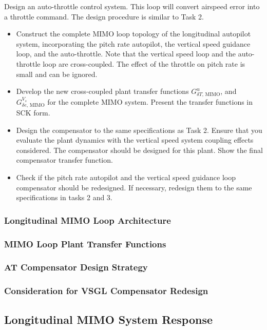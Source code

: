 Design an auto-throttle control system. This loop will convert airspeed error into a throttle command. The design procedure is similar to Task 2.
\begin{itemize}
\item Construct the complete MIMO loop topology of the longitudinal autopilot system, incorporating the pitch rate autopilot, the vertical speed guidance loop, and the auto-throttle. Note that the vertical speed loop and the auto-throttle loop
are cross-coupled. The effect of the throttle on pitch rate is small and can be ignored.
\item Develop the new cross-coupled plant transfer functions $G^{u}_{\delta T \text{, MIMO}}$, and $G^{V_s}_{\delta e \text{, MIMO}}$ for the complete MIMO system. Present the transfer functions in SCK form.
\item Design the compensator to the same specifications as Task 2. Ensure that you evaluate the plant dynamics with the vertical speed system coupling effects considered. The compensator should be designed for this plant. Show the final
compensator transfer function.
\item Check if the pitch rate autopilot and the vertical speed guidance loop compensator should be redesigned. If necessary, redesign  them to the same specifications in tasks 2 and 3.
\end{itemize}
\subsubsection{Longitudinal MIMO Loop Architecture}

\subsubsection{MIMO Loop Plant Transfer Functions}

\subsubsection{AT Compensator Design Strategy}

\subsubsection{Consideration for VSGL Compensator Redesign}

\subsection{Longitudinal MIMO System Response}

